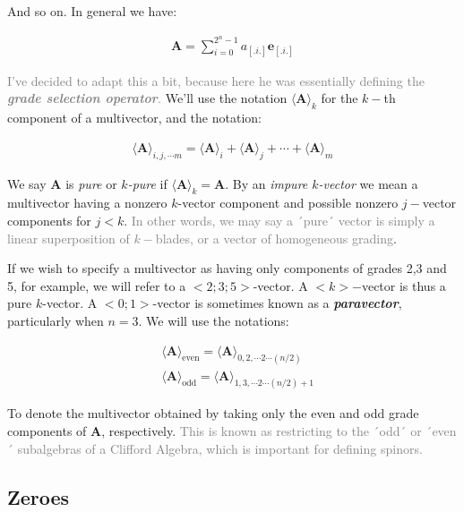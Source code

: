 \documentclass[a4paper]{book}
\numberwithin{equation}{chapter}
\begin{document}
And so on. In general we have:

\begin{align*}
    \mathbf{A} = \sum_{i=0}^{2^n-1} a_{[.i.]}\mathbf{e}_{[.i.]}
\end{align*}

 \vspace{\baselineskip}
 
\textcolor{gray}{I've decided to adapt this a bit, because here he was essentially defining
the \emph{\textbf{grade selection operator}.}} We'll use the notation $\langle \mathbf{A} \rangle_k$
for the $k-$th component of a multivector, and the notation:

\begin{align*}
   \langle \mathbf{A} \rangle_{i,j,\cdots m} = \langle \mathbf{A} \rangle_i 
   +\langle \mathbf{A} \rangle_j + \cdots + \langle \mathbf{A} \rangle_m
\end{align*}

We say $\mathbf{A}$ is \emph{pure} or \emph{$k$-pure} if $\langle \mathbf{A} \rangle_k = \mathbf{A}$.
By an \emph{impure $k$-vector} we mean a multivector having a nonzero $k$-vector component
and possible nonzero $j-$vector components for $j<k$. \textcolor{gray}{In other words,
we may say a ´pure´ vector is simply a linear superposition of $k-$blades, or a 
vector of homogeneous grading}.

 \vspace{\baselineskip}
 
If we wish to specify a multivector as having only components of grades 2,3 and 5, for example, 
we will refer to a $<2;3;5>$-vector. A $<k>-$vector is thus a pure $k$-vector. 
A $<0;1>$-vector is sometimes known as a \textbf{\emph{paravector}}, particularly when $n=3$.
We will use the notations:

\begin{align*}
    &\langle \mathbf{A} \rangle_{\text{even}} =  \langle \mathbf{A} \rangle_{0,2,\cdots 2\cdots(n/2)} \\
    &\langle \mathbf{A} \rangle_{\text{odd}} =  \langle \mathbf{A} \rangle_{1,3,\cdots 2\cdots(n/2)+1}
\end{align*}

To denote the multivector obtained by taking only the even and odd grade components of 
$\mathbf{A}$, respectively. \textcolor{gray}{This is known as restricting to the ´odd´ or
´even´ subalgebras of a Clifford Algebra, which is important for defining spinors.}
    
    \subsection{Zeroes}
\end{document}
